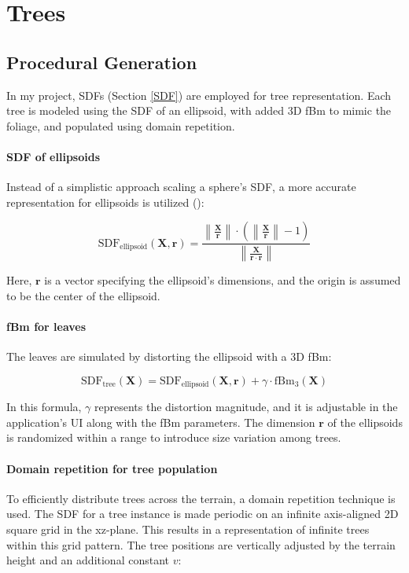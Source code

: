 \section{Trees}

\subsection{Procedural Generation}
\label{Tree Procedural Generation}

In my project, SDFs (Section \ref{SDF}) are employed for tree representation. Each tree is modeled using the SDF of an ellipsoid, with added 3D fBm to mimic the foliage, and populated using domain repetition. 

\paragraph{SDF of ellipsoids}
Instead of a simplistic approach scaling a sphere's SDF, a more accurate representation for ellipsoids is utilized ():

\begin{equation}
\text{SDF}_\text{ellipsoid}(\mathbf{X}, \mathbf{r}) = \frac{\left\|\frac{\mathbf{X}}{\mathbf{r}}\right\| \cdot \left(\left\|\frac{\mathbf{X}}{\mathbf{r}}\right\| - 1\right)}{\left\|\frac{\mathbf{X}}{\mathbf{r} \cdot \mathbf{r}}\right\|}
\end{equation}

Here, $\mathbf{r}$ is a vector specifying the ellipsoid's dimensions, and the origin is assumed to be the center of the ellipsoid.

\paragraph{fBm for leaves}
The leaves are simulated by distorting the ellipsoid with a 3D fBm:

\begin{equation}
\text{SDF}_\text{tree}(\mathbf{X}) = \text{SDF}_\text{ellipsoid}(\mathbf{X}, \mathbf{r}) + \gamma \cdot \text{fBm}_3(\mathbf{X})
\end{equation}

In this formula, $\gamma$ represents the distortion magnitude, and it is adjustable in the application's UI along with the fBm parameters. The dimension $\mathbf{r}$ of the ellipsoids is randomized within a range to introduce size variation among trees.

\paragraph{Domain repetition for tree population}
To efficiently distribute trees across the terrain, a domain repetition technique is used. The SDF for a tree instance is made periodic on an infinite axis-aligned 2D square grid in the xz-plane. This results in a representation of infinite trees within this grid pattern. The tree positions are vertically adjusted by the terrain height and an additional constant $v$:


